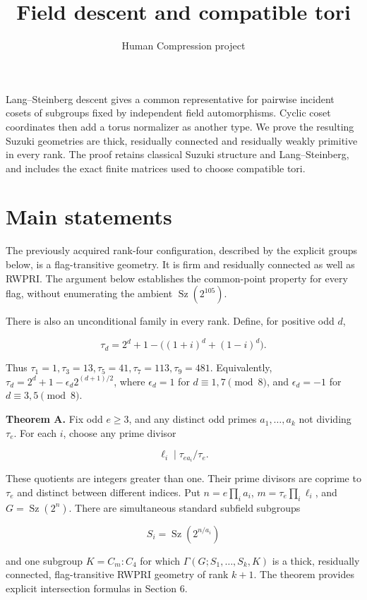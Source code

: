 \documentclass[11pt,a4paper]{article}
\title{Field descent and compatible tori}
\author{Human Compression project}\date{}
\begin{document}
\maketitle
Lang--Steinberg descent gives a common representative for pairwise
incident cosets of subgroups fixed by independent field automorphisms.
Cyclic coset coordinates then add a torus normalizer as another type. We
prove the resulting Suzuki geometries are thick, residually connected
and residually weakly primitive in every rank. The proof retains
classical Suzuki structure and Lang--Steinberg, and includes the exact
finite matrices used to choose compatible tori.

\section{Main statements}\label{main-statements}

The previously acquired rank-four configuration, described by the
explicit groups below, is a flag-transitive geometry. It is firm and
residually connected as well as RWPRI. The argument below establishes
the common-point property for every flag, without enumerating the
ambient \(\operatorname{Sz}(2^{105})\).

There is also an unconditional family in every rank. Define, for
positive odd \(d\),

\[
\tau_d=2^d+1-\big((1+i)^d+(1-i)^d\big).
\tag{1}
\]

Thus \(\tau_1=1,\tau_3=13,\tau_5=41,\tau_7=113,\tau_9=481\).
Equivalently, \(\tau_d=2^d+1-\epsilon_d2^{(d+1)/2}\), where
\(\epsilon_d=1\) for \(d\equiv1,7\pmod8\), and \(\epsilon_d=-1\) for
\(d\equiv3,5\pmod8\).

\textbf{Theorem A.} Fix odd \(e\ge3\), and any distinct odd primes
\(a_1,\ldots,a_k\) not dividing \(\tau_e\). For each \(i\), choose any
prime divisor

\[
\ell_i\mid \tau_{ea_i}/\tau_e.
\]

These quotients are integers greater than one. Their prime divisors are
coprime to \(\tau_e\) and distinct between different indices. Put
\(n=e\prod_i a_i\), \(m=\tau_e\prod_i\ell_i\), and
\(G=\operatorname{Sz}(2^n)\). There are simultaneous standard subfield
subgroups

\[
S_i=\operatorname{Sz}(2^{n/a_i})
\]

and one subgroup \(K=C_m:C_4\) for which \(\Gamma(G;S_1,\ldots,S_k,K)\)
is a thick, residually connected, flag-transitive RWPRI geometry of rank
\(k+1\). The theorem provides explicit intersection formulas in Section
6.
\end{document}
